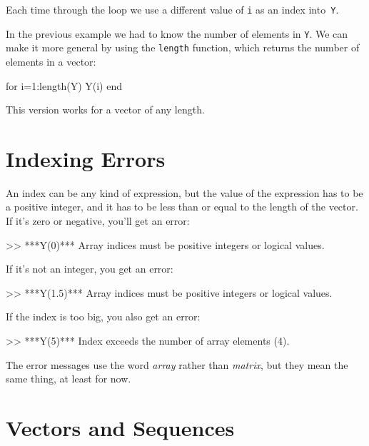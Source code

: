 Each time through the loop we use a different value of \lstinline{i}
as an index into~\lstinline{Y}.


In the previous example we had to know the number
of elements in \lstinline{Y}.  We can make it more general by using
the \lstinline{length} function, which returns the number of elements
in a vector:

\begin{code}
for i=1:length(Y)
     Y(i)
end
\end{code}

This version works for a vector of any length.


\section{Indexing Errors}


An index can be any kind of expression, but the value of the
expression has to be a positive integer, and it has to be
less than or equal to the length of the vector.  If it's
zero or negative, you'll get an error:

\begin{code}
>> ***Y(0)***
Array indices must be positive integers or logical values.
\end{code}

If it's not an integer, you get an error:

\begin{code}
>> ***Y(1.5)***
Array indices must be positive integers or logical values.
\end{code}

If the index is too big, you also get an error:

\begin{code}
>> ***Y(5)***
Index exceeds the number of array elements (4).
\end{code}

The error messages use the word \emph{array} rather than \emph{matrix}, but they mean the same thing, at least for now.


\section{Vectors and Sequences}
\label{vecseq}

